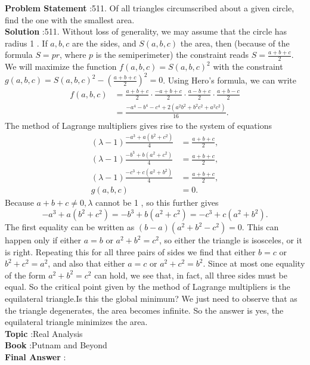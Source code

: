 \documentclass[10pt]{article}
\begin{document}
\textbf{Problem Statement} :511. Of all triangles circumscribed about a given circle, find the one with the smallest area.\\
\textbf{Solution} :511. Without loss of generality, we may assume that the circle has radius 1 . If $a, b, c$ are the sides, and $S(a, b, c)$ the area, then (because of the formula $S=p r$, where $p$ is the semiperimeter) the constraint reads $S=\frac{a+b+c}{2}$. We will maximize the function $f(a, b, c)=S(a, b, c)^{2}$ with the constraint $g(a, b, c)=S(a, b, c)^{2}-\left(\frac{a+b+c}{2}\right)^{2}=0$. Using Hero's formula, we can write$$ \begin{aligned} f(a, b, c) &=\frac{a+b+c}{2} \cdot \frac{-a+b+c}{2} \cdot \frac{a-b+c}{2} \cdot \frac{a+b-c}{2} \\ &=\frac{-a^{4}-b^{4}-c^{4}+2\left(a^{2} b^{2}+b^{2} c^{2}+a^{2} c^{2}\right)}{16} . \end{aligned} $$The method of Lagrange multipliers gives rise to the system of equations$$ \begin{aligned} (\lambda-1) \frac{-a^{3}+a\left(b^{2}+c^{2}\right)}{4} &=\frac{a+b+c}{2}, \\ (\lambda-1) \frac{-b^{3}+b\left(a^{2}+c^{2}\right)}{4} &=\frac{a+b+c}{2}, \\ (\lambda-1) \frac{-c^{3}+c\left(a^{2}+b^{2}\right)}{4} &=\frac{a+b+c}{2}, \\ g(a, b, c) &=0 . \end{aligned} $$Because $a+b+c \neq 0, \lambda$ cannot be 1 , so this further gives$$ -a^{3}+a\left(b^{2}+c^{2}\right)=-b^{3}+b\left(a^{2}+c^{2}\right)=-c^{3}+c\left(a^{2}+b^{2}\right) . $$The first equality can be written as $(b-a)\left(a^{2}+b^{2}-c^{2}\right)=0$. This can happen only if either $a=b$ or $a^{2}+b^{2}=c^{2}$, so either the triangle is isosceles, or it is right. Repeating this for all three pairs of sides we find that either $b=c$ or $b^{2}+c^{2}=a^{2}$, and also that either $a=c$ or $a^{2}+c^{2}=b^{2}$. Since at most one equality of the form $a^{2}+b^{2}=c^{2}$ can hold, we see that, in fact, all three sides must be equal. So the critical point given by the method of Lagrange multipliers is the equilateral triangle.Is this the global minimum? We just need to observe that as the triangle degenerates, the area becomes infinite. So the answer is yes, the equilateral triangle minimizes the area.\\
\textbf{Topic} :Real Analysis\\
\textbf{Book} :Putnam and Beyond\\
\textbf{Final Answer} :\\
\end{document}
